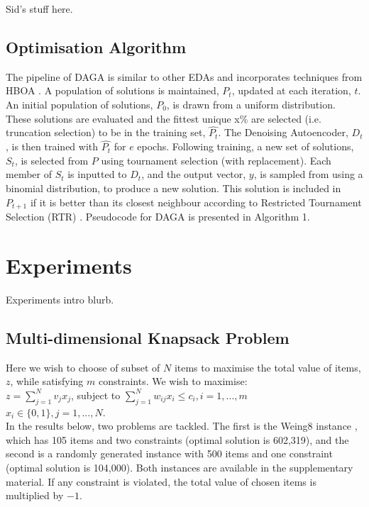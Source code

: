 \documentclass[runningheads,a4paper]{llncs}
\begin{document}
Sid's stuff here.

\subsection{Optimisation Algorithm}

The pipeline of DAGA is similar to other EDAs and incorporates techniques from HBOA \cite{hboa}. A population of solutions is maintained, \(P_t\), updated at each iteration, \(t\). An initial population of solutions, \(P_0\), is drawn from a uniform distribution. These solutions are evaluated and the fittest unique x\% are selected (i.e. truncation selection) to be in the training set, \(\hat{P_t}\). The Denoising Autoencoder, \(D_t\), is then trained with \(\hat{P_t}\) for \(e\) epochs. Following training, a new set of solutions, \(S_t\), is selected from \(P\) using tournament selection (with replacement). Each member of \(S_t\) is inputted to \(D_t\), and the output vector, \(y\), is sampled from using a binomial distribution, to produce a new solution. This solution is included in \(P_{t+1}\) if it is better than its closest neighbour according to Restricted Tournament Selection (RTR) \cite{hboa}. Pseudocode for DAGA is presented in Algorithm 1.

\section{Experiments}
\label{sec:experiments}
Experiments intro blurb.

\subsection{Multi-dimensional Knapsack Problem}
Here we wish to choose of subset of \(N\) items to maximise the total value of items, \(z\), while satisfying \(m\) constraints. We wish to maximise:
\vspace{2mm}\\
\(z = \sum_{j=1}^{N} v_jx_j\), subject to \(\sum_{j=1}^{N} w_{ij}x_i \leq c_i, i = 1, ..., m\)
\vspace{2mm}\\
\(x_i \in \{0,1\}, j = 1, ..., N\).
\vspace{2mm}\\
In the results below, two problems are tackled. The first is the Weing8 instance \cite{ref}, which has 105 items and two constraints (optimal solution is 602,319), and the second is a randomly generated instance with 500 items and one constraint (optimal solution is 104,000). Both instances are available in the supplementary material. If any constraint is violated, the total value of chosen items is multiplied by \(-1\).
\end{document}
